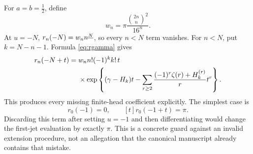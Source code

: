 For $a=b=\tfrac12$, define
\begin{equation}\label{eq:wn}
 w_n=\pi\frac{\binom{2n}{n}^{\!2}}{16^n}.
\end{equation}
At $u=-N$, $r_n(-N)=w_nn^{\underline{N}}$, so every $n<N$ term vanishes.
For $n<N$, put $k=N-n-1$.  Formula \eqref{eq:rgamma} gives
\begin{align}
 r_n(-N+t)={}&w_n n!(-1)^k k!\,t\notag\\
 &\times\exp\left\{(\gamma-H_k)t
 -\sum_{r\ge2}\frac{(-1)^r\zeta(r)+H_k^{(r)}}r t^r\right\}.
 \label{eq:revival}
\end{align}
This produces every missing finite-head coefficient explicitly.
The simplest case is
\begin{equation}\label{eq:piwarning}
 r_0(-1)=0,\qquad [t]r_0(-1+t)=\pi.
\end{equation}
Discarding this term after setting $u=-1$ and then differentiating would
change the first-jet evaluation by exactly $\pi$.
This is a concrete guard against an invalid extension procedure, not an
allegation that the canonical manuscript already contains that mistake.
